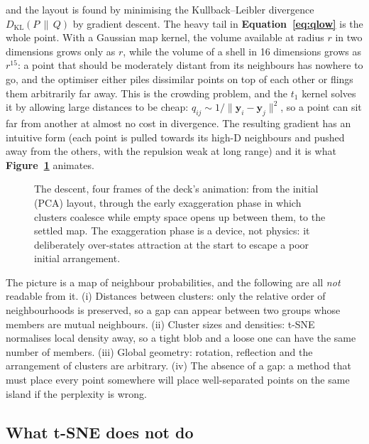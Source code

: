 and the layout is found by minimising the Kullback--Leibler divergence
$D_{\mathrm{KL}}(P \,\|\, Q)$ by gradient descent. The heavy tail in
\textbf{Equation~\ref{eq:qlow}} is the whole point. With a Gaussian map kernel,
the volume available at radius $r$ in two dimensions grows only as $r$, while
the volume of a shell in 16 dimensions grows as $r^{15}$: a point that should
be moderately distant from its neighbours has nowhere to go, and the optimiser
either piles dissimilar points on top of each other or flings them arbitrarily
far away. This is the crowding problem, and the $t_1$ kernel solves it by
allowing large distances to be cheap: $q_{ij} \sim 1/\|\mathbf{y}_i -
\mathbf{y}_j\|^2$, so a point can sit far from another at almost no cost in
divergence. The resulting gradient has an intuitive form (each point is pulled
towards its high-D neighbours and pushed away from the others, with the
repulsion weak at long range) and it is what \textbf{Figure~\ref{fig:tsnefilm}}
animates.

\begin{figure}[htbp]\centering
  \caption{The descent, four frames of the deck's animation: from the initial
  (PCA) layout, through the early exaggeration phase in which clusters
  coalesce while empty space opens up between them, to the settled map. The
  exaggeration phase is a device, not physics: it deliberately over-states
  attraction at the start to escape a poor initial arrangement.}
  \label{fig:tsnefilm}
\end{figure}

\begin{issues}
The picture is a map of neighbour probabilities, and the following are all
\emph{not} readable from it. (i) Distances between clusters: only the relative
order of neighbourhoods is preserved, so a gap can appear between two groups
whose members are mutual neighbours. (ii) Cluster sizes and densities: t-SNE
normalises local density away, so a tight blob and a loose one can have the
same number of members. (iii) Global geometry: rotation, reflection and the
arrangement of clusters are arbitrary. (iv) The absence of a gap: a method
that must place every point somewhere will place well-separated points on the
same island if the perplexity is wrong.
\end{issues}

\subsection{What t-SNE does not do}

